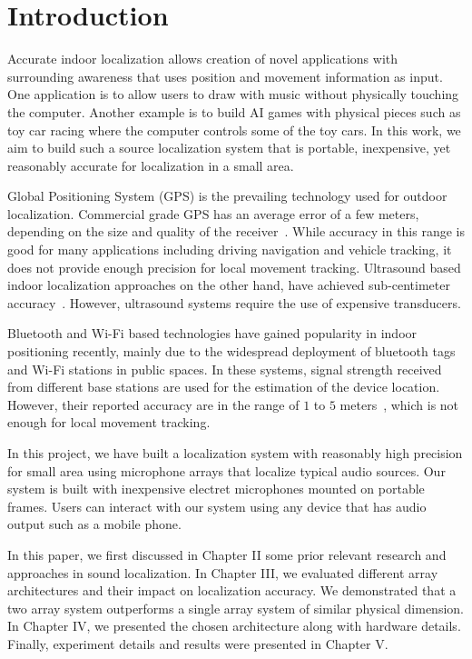 \chapter{Introduction}

Accurate indoor localization allows creation of novel applications with surrounding awareness that uses position and movement information as input. One application is to allow users to draw with music without physically touching the computer. Another example is to build AI games with physical pieces such as toy car racing where the computer controls some of the toy cars. In this work, we aim to build such a source localization system that is portable, inexpensive, yet reasonably accurate for localization in a small area. 

Global Positioning System (GPS) is the prevailing technology used for outdoor localization. Commercial grade GPS has an average error of a few meters, depending on the size and quality of the receiver~\cite{intro:gps}. While accuracy in this range is good for many applications including driving navigation and vehicle tracking, it does not provide enough precision for local movement tracking. Ultrasound based indoor localization approaches on the other hand, have achieved sub-centimeter accuracy~\cite{intro:ultra}. However, ultrasound systems require the use of expensive transducers.

Bluetooth and Wi-Fi based technologies have gained popularity in indoor positioning recently, mainly due to the widespread deployment of bluetooth tags and Wi-Fi stations in public spaces. In these systems, signal strength received from different base stations are used for the estimation of the device location. However, their reported accuracy are in the range of $1$ to $5$ meters~\cite{intro:blue, intro:loc}, which is not enough for local movement tracking.

In this project, we have built a localization system with reasonably high precision for small area using microphone arrays that localize typical audio sources. Our system is built with inexpensive electret microphones mounted on portable frames. Users can interact with our system using any device that has audio output such as a mobile phone.

In this paper, we first discussed in Chapter II some prior relevant research and approaches in sound localization. In Chapter III, we evaluated different array architectures and their impact on localization accuracy. We demonstrated that a two array system outperforms a single array system of similar physical dimension. In Chapter IV, we presented the chosen architecture along with hardware details. Finally, experiment details and results were presented in Chapter V.
